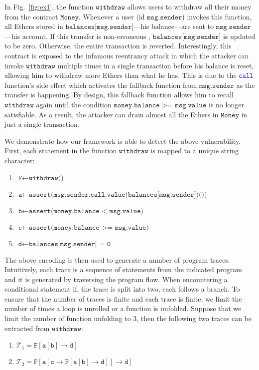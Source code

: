 \documentclass[runningheads]{llncs}
\newcommand{\code}[1]{\texttt{#1}}
\begin{document}
In Fig.~\ref{fig:ex1}, the function $\code{withdraw}$ allows users to withdraw all their money from the contract $\code{Money}$. Whenever a user (id $\code{msg.sender}$) invokes this function, all Ethers stored in $\code{balances[msg.sender]}$---his balance---are sent to $\code{msg.sender}$---his account. If this transfer is non-erroneous ,  $\code{balances[msg.sender]}$ is updated to be zero. Otherwise, the entire transaction is reverted. Interestingly, this contract is exposed to the infamous reentrancy attack in which the attacker can invoke $\texttt{withdraw}$ multiple times in a single transaction before his balance is reset, allowing him to withdraw more Ethers than what he has. This is due to the $\color{blue}\texttt{call}$ function's side effect which activates the fallback function from $\texttt{msg.sender}$ as the transfer is happening. By design, this fallback function allows him to recall $\texttt{withdraw}$ again until the condition $\texttt{money.balance >= msg.value}$ is no longer satisfiable. As a result, the attacker can drain almost all the Ethers in $\texttt{Money}$ in just a single transaction.

We demonstrate how our framework is able to detect the above vulnerability. First, each statement in the function $\code{withdraw}$ is mapped to a unique string character:
\begin{enumerate}
	\item $\code{F} \leftarrow \code{withdraw()}$
	\item $\code{a} \leftarrow \code{assert(msg.sender.call.value(balances[msg.sender])())}$
	\item $\code{b} \leftarrow \code{assert(money.balance < msg.value)}$
	\item  $\code{c} \leftarrow \code{assert(money.balance >= msg.value)}$
	\item  $\code{d} \leftarrow \code{balances[msg.sender] = 0}$
\end{enumerate}

The above encoding is then used to generate a number of program traces. Intuitively, each trace is a sequence of statements from the indicated program and it is generated by traversing the program flow. When encountering a conditional statement if, the trace is split into two, each follows a branch. To ensure that the number of traces is finite and each trace is finite, we limit the number of times a loop is unrolled or a function is unfolded. Suppose that we limit the number of function unfolding to 3, then the following two traces can be extracted from $\code{withdraw}$:
\begin{enumerate}
	\item $
	\mathcal{T}_1 = \code{F}[\code{a}[\code{b}] \rightarrow \code{d}]$
	\item $\mathcal{T}_2 = \code{F}[\code{a}[\code{c} \rightarrow \code{F}[\code{a}[\code{b}] \rightarrow \code{d} ]] \rightarrow \code{d}]
	$
\end{enumerate}
\end{document}
